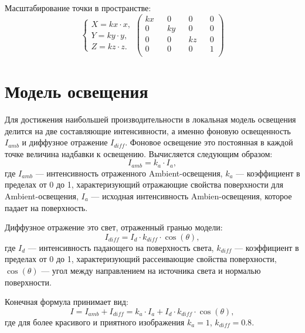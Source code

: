 Масштабирование точки в пространстве:
\begin{equation*}
	\begin{cases}
		X = kx \cdot x, \\
		Y = ky \cdot y, \\
		Z = kz \cdot z.
	\end{cases}
	\begin{pmatrix}
		kx && 0 && 0 && 0 \\
		0 && ky && 0 && 0 \\
		0 && 0 && kz && 0 \\
		0 && 0 && 0 && 1 \\
	\end{pmatrix}
\end{equation*}

\section{Модель освещения}

Для достижения наибольшей производительности в локальная модель освещения делится на две составляющие интенсивности, а именно фоновую освещенность $I_{amb}$ и диффузное отражение $I_{diff}$. Фоновое освещение это постоянная в каждой точке величина надбавки к освещению. Вычисляется следующим образом:
\begin{equation*}
	I_{amb} = k_{a} \cdot I_{a},
\end{equation*}
где $I_{amb}$ --- интенсивность отраженного Ambient-освещения, $k_{a}$ --- коэффициент в пределах от 0 до 1, характеризующий отражающие свойства поверхности для Ambient-освещения, $I_{a}$ --- исходная интенсивность Ambien-освещения, которое падает на поверхность.

Диффузное отражение это свет, отраженный гранью модели:
\begin{equation*}
	I_{diff} = I_{d} \cdot k_{diff} \cdot \cos(\theta),
\end{equation*}
где $I_{d}$ --- интенсивность падающего на поверхность света, $k_{diff}$ --- коэффициент в пределах от 0 до 1, характеризующий рассеивающие свойства поверхности, $\cos(\theta)$ --- угол между направлением на источника света и нормалью поверхности.

Конечная формула принимает вид:
\begin{equation*}
	I = I_{amb} + I_{diff} = k_{a} \cdot I_{a} + I_{d} \cdot k_{diff} \cdot \cos(\theta), 
\end{equation*}
где для более красивого и приятного изображения $k_{a} = 1$, $k_{diff} = 0.8$.

